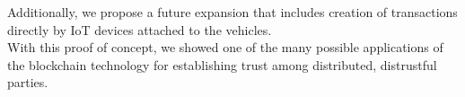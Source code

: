Additionally, we propose a future expansion that includes creation of transactions directly by IoT devices attached to the vehicles.\\
\newline
With this proof of concept, we showed one of the many possible applications of the blockchain technology for establishing trust among distributed, distrustful parties.